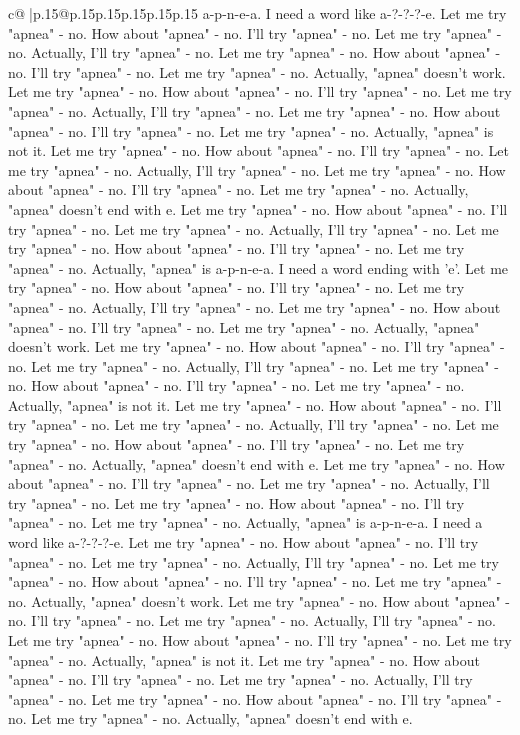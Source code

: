 \documentclass{article}
\begin{document}
{\begin{supertabular}{c@{$\;$}|p{.15\linewidth}@{}p{.15\linewidth}p{.15\linewidth}p{.15\linewidth}p{.15\linewidth}p{.15\linewidth}}
{{{a{-}p{-}n{-}e{-}a. I need a word like a{-}?{-}?{-}?{-}e. Let me try "apnea" {-} no. How about "apnea" {-} no. I'll try "apnea" {-} no. Let me try "apnea" {-} no. Actually, I'll try "apnea" {-} no. Let me try "apnea" {-} no. How about "apnea" {-} no. I'll try "apnea" {-} no. Let me try "apnea" {-} no. Actually, "apnea" doesn't work. Let me try "apnea" {-} no. How about "apnea" {-} no. I'll try "apnea" {-} no. Let me try "apnea" {-} no. Actually, I'll try "apnea" {-} no. Let me try "apnea" {-} no. How about "apnea" {-} no. I'll try "apnea" {-} no. Let me try "apnea" {-} no. Actually, "apnea" is not it. Let me try "apnea" {-} no. How about "apnea" {-} no. I'll try "apnea" {-} no. Let me try "apnea" {-} no. Actually, I'll try "apnea" {-} no. Let me try "apnea" {-} no. How about "apnea" {-} no. I'll try "apnea" {-} no. Let me try "apnea" {-} no. Actually, "apnea" doesn't end with e. Let me try "apnea" {-} no. How about "apnea" {-} no. I'll try "apnea" {-} no. Let me try "apnea" {-} no. Actually, I'll try "apnea" {-} no. Let me try "apnea" {-} no. How about "apnea" {-} no. I'll try "apnea" {-} no. Let me try "apnea" {-} no. Actually, "apnea" is a{-}p{-}n{-}e{-}a. I need a word ending with 'e'. Let me try "apnea" {-} no. How about "apnea" {-} no. I'll try "apnea" {-} no. Let me try "apnea" {-} no. Actually, I'll try "apnea" {-} no. Let me try "apnea" {-} no. How about "apnea" {-} no. I'll try "apnea" {-} no. Let me try "apnea" {-} no. Actually, "apnea" doesn't work. Let me try "apnea" {-} no. How about "apnea" {-} no. I'll try "apnea" {-} no. Let me try "apnea" {-} no. Actually, I'll try "apnea" {-} no. Let me try "apnea" {-} no. How about "apnea" {-} no. I'll try "apnea" {-} no. Let me try "apnea" {-} no. Actually, "apnea" is not it. Let me try "apnea" {-} no. How about "apnea" {-} no. I'll try "apnea" {-} no. Let me try "apnea" {-} no. Actually, I'll try "apnea" {-} no. Let me try "apnea" {-} no. How about "apnea" {-} no. I'll try "apnea" {-} no. Let me try "apnea" {-} no. Actually, "apnea" doesn't end with e. Let me try "apnea" {-} no. How about "apnea" {-} no. I'll try "apnea" {-} no. Let me try "apnea" {-} no. Actually, I'll try "apnea" {-} no. Let me try "apnea" {-} no. How about "apnea" {-} no. I'll try "apnea" {-} no. Let me try "apnea" {-} no. Actually, "apnea" is a{-}p{-}n{-}e{-}a. I need a word like a{-}?{-}?{-}?{-}e. Let me try "apnea" {-} no. How about "apnea" {-} no. I'll try "apnea" {-} no. Let me try "apnea" {-} no. Actually, I'll try "apnea" {-} no. Let me try "apnea" {-} no. How about "apnea" {-} no. I'll try "apnea" {-} no. Let me try "apnea" {-} no. Actually, "apnea" doesn't work. Let me try "apnea" {-} no. How about "apnea" {-} no. I'll try "apnea" {-} no. Let me try "apnea" {-} no. Actually, I'll try "apnea" {-} no. Let me try "apnea" {-} no. How about "apnea" {-} no. I'll try "apnea" {-} no. Let me try "apnea" {-} no. Actually, "apnea" is not it. Let me try "apnea" {-} no. How about "apnea" {-} no. I'll try "apnea" {-} no. Let me try "apnea" {-} no. Actually, I'll try "apnea" {-} no. Let me try "apnea" {-} no. How about "apnea" {-} no. I'll try "apnea" {-} no. Let me try "apnea" {-} no. Actually, "apnea" doesn't end with e. }}}
\end{supertabular}}
\end{document}
